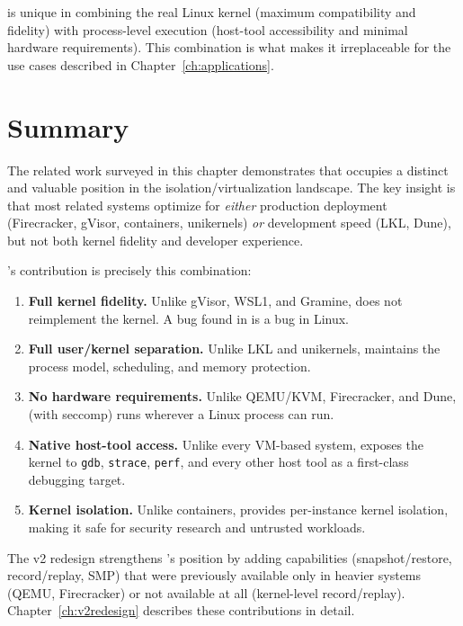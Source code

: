 \UML{} is unique in combining the real Linux kernel (maximum
compatibility and fidelity) with process-level execution (host-tool
accessibility and minimal hardware requirements).  This combination
is what makes it irreplaceable for the use cases described in
Chapter~\ref{ch:applications}.


\section{Summary}
\label{sec:related-summary}

The related work surveyed in this chapter demonstrates that \UML{}
occupies a distinct and valuable position in the isolation/virtualization
landscape.  The key insight is that most related systems optimize for
\emph{either} production deployment (Firecracker, gVisor, containers,
unikernels) \emph{or} development speed (LKL, Dune), but not both
kernel fidelity and developer experience.

\UML{}'s contribution is precisely this combination:

\begin{enumerate}[leftmargin=2em]
  \item \textbf{Full kernel fidelity.}  Unlike gVisor, WSL1, and
        Gramine, \UML{} does not reimplement the kernel.  A bug
        found in \UML{} is a bug in Linux.

  \item \textbf{Full user/kernel separation.}  Unlike \textsc{LKL}
        and unikernels, \UML{} maintains the process model, scheduling,
        and memory protection.

  \item \textbf{No hardware requirements.}  Unlike QEMU/KVM,
        Firecracker, and Dune, \UML{} (with seccomp) runs wherever
        a Linux process can run.

  \item \textbf{Native host-tool access.}  Unlike every VM-based
        system, \UML{} exposes the kernel to \texttt{gdb},
        \texttt{strace}, \texttt{perf}, and every other host tool
        as a first-class debugging target.

  \item \textbf{Kernel isolation.}  Unlike containers, \UML{} provides
        per-instance kernel isolation, making it safe for security
        research and untrusted workloads.
\end{enumerate}

The v2 redesign strengthens \UML{}'s position by adding capabilities
(snapshot/restore, record/replay, SMP) that were previously available
only in heavier systems (QEMU, Firecracker) or not available at all
(kernel-level record/replay).  Chapter~\ref{ch:v2redesign} describes
these contributions in detail.
